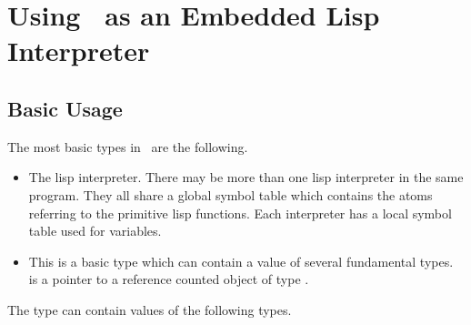 %
%
%
%
%
\section{Using \lips\ as an Embedded Lisp Interpreter}
\subsection{Basic Usage}
The most basic types in \lips\ are the following.
\begin{itemize}
  \item {} The lisp interpreter. There may be more than
    one lisp interpreter in the same program. They all share a global
    symbol table which contains the atoms referring to the primitive
    lisp functions. Each interpreter has a local symbol table used for
    variables.
  \item {} This is a basic type which can contain a value of
    several fundamental types.  is a pointer to a reference
    counted object of type .
\end{itemize}

The  type can contain values of the following types.

